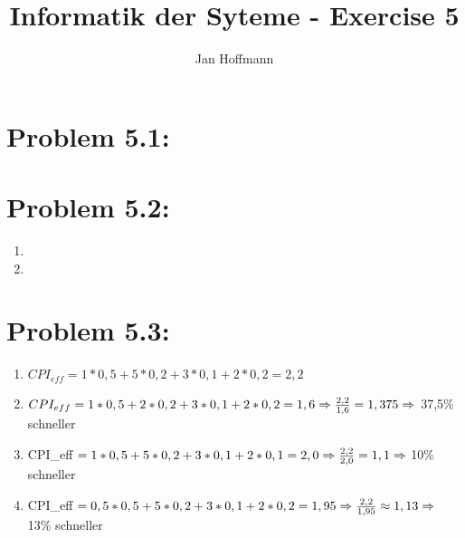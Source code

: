 \documentclass[10pt,a4paper]{article}
\title{Informatik der Syteme - Exercise 5}
\author{Jan Hoffmann}
\begin{document}
\section*{Problem 5.1:}

\section*{Problem 5.2:}
\begin{enumerate}
	\item 
	\item 
\end{enumerate}

\section*{Problem 5.3:}
\begin{enumerate}	
	\item $CPI_{eff} = 1 * 0,5 + 5 * 0,2 + 3 * 0,1 + 2 * 0,2 = 2,2$ 
	\item $CPI_{eff} = 1 * 0,5 + 2 * 0,2 + 3 * 0,1 + 2 * 0,2 = 1,6 \\
				\Rightarrow {} = 1,375 \Rightarrow  $ 37,5\% schneller 
	\item CPI_{eff} $= 1 * 0,5 + 5 * 0,2 + 3 * 0,1 + 2* 0,1 = 2,0 \\
				\Rightarrow {} = 1,1 \Rightarrow  $ 10\% schneller
	\item CPI_{eff} $= 0,5 * 0,5 + 5 * 0,2 + 3 * 0,1 + 2 * 0,2 = 1,95 \\
				\Rightarrow {} ,13  \Rightarrow $ 13\% schneller
\end{enumerate}
\end{document}
